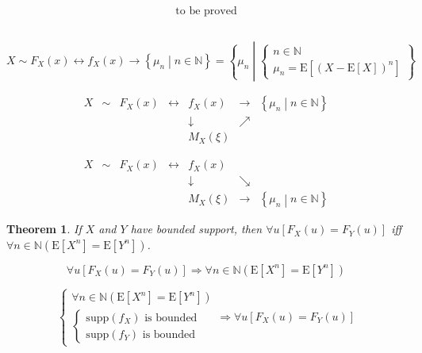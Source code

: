 \documentclass[
]{book}
\newtheorem{theorem}{Theorem}[chapter]
\theoremstyle{definition}
\theoremstyle{definition}
\theoremstyle{definition}
\theoremstyle{definition}
\theoremstyle{remark}
\begin{document}
\[
\begin{aligned}
\text{to be proved}
\end{aligned}
\]

\[
\tag*{$\Box$}
\]

\[
X\sim F_{{\scriptscriptstyle X}}\left(x\right)\leftrightarrow f_{{\scriptscriptstyle X}}\left(x\right)\rightarrow\left\{ \mu_{{\scriptscriptstyle n}}\middle|n\in\mathbb{N}\right\} =\left\{ \mu_{{\scriptscriptstyle n}}\middle|\begin{cases}
n\in\mathbb{N}\\
\mu_{{\scriptscriptstyle n}}=\mathrm{E}\left[\left(X-\mathrm{E}\left[X\right]\right)^{n}\right]
\end{cases}\right\} 
\]

\[
\begin{array}{ccccccc}
X & \sim & F_{{\scriptscriptstyle X}}\left(x\right) & \leftrightarrow & f_{{\scriptscriptstyle X}}\left(x\right) & \rightarrow & \left\{ \mu_{{\scriptscriptstyle n}}\middle|n\in\mathbb{N}\right\} \\
 &  &  &  & \downarrow & \nearrow\\
 &  &  &  & M_{{\scriptscriptstyle X}}\left(\xi\right)
\end{array}
\]

\[
\begin{array}{ccccccc}
X & \sim & F_{{\scriptscriptstyle X}}\left(x\right) & \leftrightarrow & f_{{\scriptscriptstyle X}}\left(x\right)\\
 &  &  &  & \downarrow & \searrow\\
 &  &  &  & M_{{\scriptscriptstyle X}}\left(\xi\right) & \rightarrow & \left\{ \mu_{{\scriptscriptstyle n}}\middle|n\in\mathbb{N}\right\} 
\end{array}
\]

\begin{theorem}
\protect\hypertarget{thm:unnamed-chunk-28}{}\label{thm:unnamed-chunk-28}If \(X\) and \(Y\) have bounded support, then \(\forall u\left[F_{{\scriptscriptstyle X}}\left(u\right)=F_{{\scriptscriptstyle Y}}\left(u\right)\right]\) iff \(\forall n\in\mathbb{N}\left(\mathrm{E}\left[X^{n}\right]=\mathrm{E}\left[Y^{n}\right]\right)\).
\end{theorem}

\[
\forall u\left[F_{{\scriptscriptstyle X}}\left(u\right)=F_{{\scriptscriptstyle Y}}\left(u\right)\right]\Rightarrow\forall n\in\mathbb{N}\left(\mathrm{E}\left[X^{n}\right]=\mathrm{E}\left[Y^{n}\right]\right)
\]

\[
\begin{cases}
\forall n\in\mathbb{N}\left(\mathrm{E}\left[X^{n}\right]=\mathrm{E}\left[Y^{n}\right]\right)\\
\begin{cases}
\mathrm{supp}\left(f_{{\scriptscriptstyle X}}\right)\text{ is bounded}\\
\mathrm{supp}\left(f_{{\scriptscriptstyle Y}}\right)\text{ is bounded}
\end{cases}
\end{cases}\Rightarrow \forall u\left[F_{{\scriptscriptstyle X}}\left(u\right)=F_{{\scriptscriptstyle Y}}\left(u\right)\right]
\]
\end{document}
